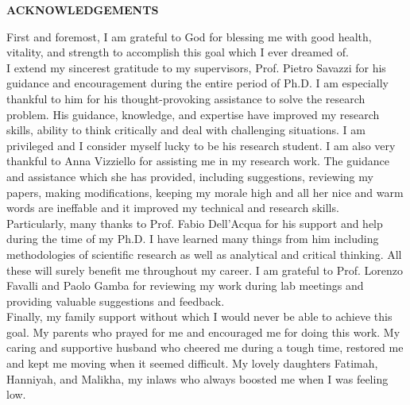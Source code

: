 \clearpage
\begin{centering}
\textbf{ACKNOWLEDGEMENTS}\\
\vspace{\baselineskip}
\end{centering}

First and foremost, I am grateful to God for blessing me with good health, vitality, and strength to accomplish this goal which I ever dreamed of. \\
I extend my sincerest gratitude to my supervisors,  Prof. Pietro Savazzi for his guidance and encouragement during the entire period of Ph.D. I am especially thankful to him for his thought-provoking assistance to solve the research problem. His guidance, knowledge, and expertise have improved my research skills, ability to think critically and deal with challenging situations. I am privileged and I consider myself lucky to be his research student. I am also very thankful to Anna Vizziello for assisting me in my research work. The guidance and assistance which she has provided, including suggestions, reviewing my papers, making modifications, keeping my morale high and all her nice and warm words are ineffable and it improved my technical and research skills.  \\
Particularly, many thanks to  Prof. Fabio Dell'Acqua for his support and help during the time of my Ph.D. I have learned many things from him including methodologies of scientific research as well as analytical and critical thinking.  All these will surely benefit me throughout my career.
I am grateful to Prof. Lorenzo Favalli and Paolo Gamba for reviewing my work during lab meetings and providing valuable suggestions and feedback.  \\
Finally, my family support without which I would never be able to achieve this goal.  My parents who prayed for me and encouraged me for doing this work. My caring and supportive husband who cheered me during a tough time,  restored me and kept me moving when it seemed difficult. My lovely daughters Fatimah, Hanniyah, and Malikha, my inlaws who always boosted me when I was feeling low. 

\clearpage
